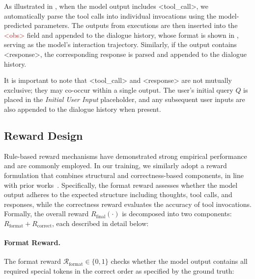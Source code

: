 As illustrated in , when the model output includes \textcolor{deepgreen}{\textless{}tool\_call\textgreater{}}, we automatically parse the tool calls into individual invocations using the model-predicted parameters. The outputs from executions are then inserted into the \textcolor{brown}{\textless{}obs\textgreater{}} field and appended to the dialogue history, whose format is shown in , serving as the model's interaction trajectory. Similarly, if the output contains \textcolor{deeppurple}{\textless{}response\textgreater{}}, the corresponding response is parsed and appended to the dialogue history.

It is important to note that \textcolor{deepgreen}{\textless{}tool\_call\textgreater{}} and \textcolor{deeppurple}{\textless{}response\textgreater{}} are not mutually exclusive; they may co-occur within a single output. The user's initial query \( Q \) is placed in the \textit{Initial User Input} placeholder, and any subsequent user inputs are also appended to the dialogue history when present.



\subsection{Reward Design}
\label{sec:reward_design}
Rule-based reward mechanisms have demonstrated strong empirical performance and are commonly employed. In our training, we similarly adopt a reward formulation that combines structural and correctness-based components, in line with prior works~\citep{jin2025search, li2025torl, xie2025logic}. Specifically, the format reward assesses whether the model output adheres to the expected structure including thoughts, tool calls, and responses, while the correctness reward evaluates the accuracy of tool invocations. Formally, the overall reward \( R_{\text{final}}(\cdot) \) is decomposed into two components: \( R_{\text{format}} + R_{\text{correct}} \), each described in detail below:

\paragraph{Format Reward.} The format reward \( \mathcal{R}_{\text{format}} \in \{0, 1\} \) checks whether the model output contains all required special tokens in the correct order as specified by the ground truth:

